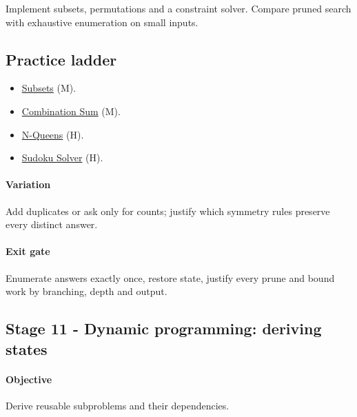 \documentclass[11pt,letterpaper]{article}
\begin{document}
Implement subsets, permutations and a constraint solver. Compare pruned search with exhaustive enumeration on small inputs.

\subsection*{Practice ladder}

\begin{itemize}

\item \href{https://leetcode.com/problems/subsets/}{Subsets} (M).

\item \href{https://leetcode.com/problems/combination-sum/}{Combination Sum} (M).

\item \href{https://leetcode.com/problems/n-queens/}{N-Queens} (H).

\item \href{https://leetcode.com/problems/sudoku-solver/}{Sudoku Solver} (H).

\end{itemize}

\paragraph*{Variation}

Add duplicates or ask only for counts; justify which symmetry rules preserve every distinct answer.

\paragraph*{Exit gate}

Enumerate answers exactly once, restore state, justify every prune and bound work by branching, depth and output.

\par{}
\begin{samepage}
\section{Stage 11 - Dynamic programming: deriving states}\label{sec:15}

\label{stage:11}


\paragraph*{Objective}

Derive reusable subproblems and their dependencies.

\end{samepage}
\end{document}
